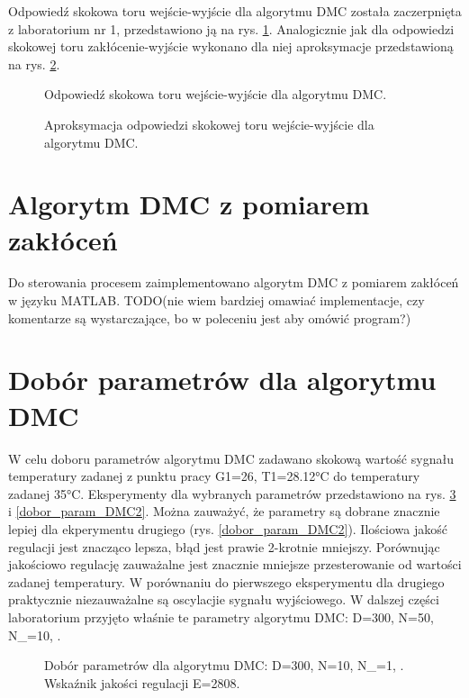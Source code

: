 \documentclass[a4paper,titlepage,11pt,twosides,floatssmall]{mwrep}
\begin{document}
Odpowiedź skokowa toru wejście-wyjście dla algorytmu DMC została zaczerpnięta z laboratorium nr 1, przedstawiono ją na rys. \ref{skok_DMC}. Analogicznie jak dla odpowiedzi skokowej toru zakłócenie-wyjście wykonano dla niej aproksymacje przedstawioną na rys. \ref{skok_DMC_apro}.

\begin{figure}[H]
	\centering
	
	\caption{Odpowiedź skokowa toru wejście-wyjście dla algorytmu DMC.}
	\label{skok_DMC}
\end{figure}

	
\begin{figure}[H]
	\centering
	
	\caption{Aproksymacja odpowiedzi skokowej toru wejście-wyjście dla algorytmu DMC.}
	\label{skok_DMC_apro}
\end{figure}

\section{Algorytm DMC z pomiarem zakłóceń}
Do sterowania procesem zaimplementowano algorytm DMC z pomiarem zakłóceń w języku MATLAB. TODO(nie wiem bardziej omawiać implementacje, czy komentarze są wystarczające, bo w poleceniu jest aby omówić program?)




\section{Dobór parametrów dla algorytmu DMC}
W celu doboru parametrów algorytmu DMC zadawano skokową wartość sygnału temperatury zadanej z punktu pracy G1=26, T1=\num{28.12}°C do temperatury zadanej \num{35}°C. Eksperymenty dla wybranych parametrów przedstawiono na rys. \ref{dobor_param_DMC1} i \ref{dobor_param_DMC2}. Można zauważyć, że parametry są dobrane znacznie lepiej dla ekperymentu drugiego (rys. \ref{dobor_param_DMC2}). Ilościowa jakość regulacji jest znacząco lepsza, błąd jest prawie 2-krotnie mniejszy. Porównując jakościowo regulację zauważalne jest znacznie mniejsze przesterowanie od wartości zadanej temperatury. W porównaniu do pierwszego eksperymentu dla drugiego praktycznie niezauważalne są oscylacjie sygnału wyjściowego. W dalszej części laboratorium przyjęto właśnie te parametry algorytmu DMC: D=300, N=50, N_{}=10, . 

\begin{figure}[H]
	\centering
	
	\caption{Dobór parametrów dla algorytmu DMC: D=300, N=10, N_{}=1, .\\ Wskaźnik jakości regulacji E=2808.}
	\label{dobor_param_DMC1}
\end{figure}
\end{document}
